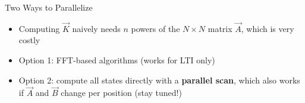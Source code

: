 \documentclass[11pt,compress,t,notes=noshow, xcolor=table]{beamer}
\begin{document}
\begin{frame}{Two Ways to Parallelize}

\vfill

\begin{itemize}
  \item Computing $\vec K$ naively needs $n$ powers of the $N \times N$ matrix $\vec A$, which is very costly
  \item Option 1: FFT-based algorithms (works for LTI only)
  \item Option 2: compute all states directly with a \textbf{parallel scan}, which also works if $\vec A$ and $\vec B$ change per position (stay tuned!)
\end{itemize}

\vfill

\end{frame}

\end{document}

